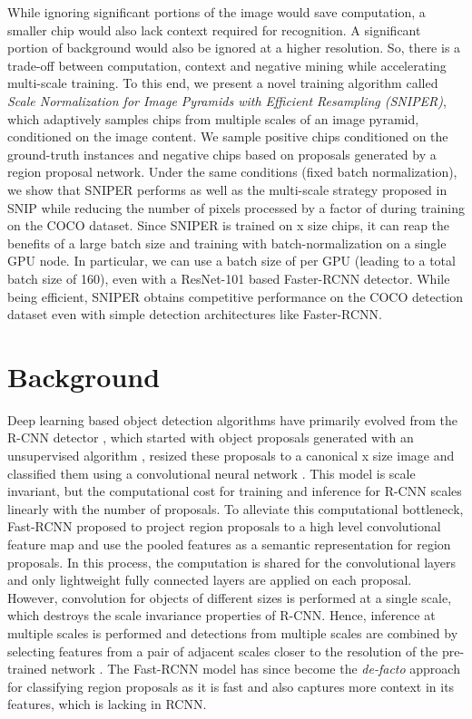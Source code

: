 \documentclass{article}
\begin{document}
While ignoring significant portions of the image would save computation, a smaller chip would also lack context required for recognition. A significant portion of background would also be ignored at a higher resolution. So, there is a trade-off between computation, context and negative mining while accelerating multi-scale training. To this end, we present a novel training algorithm called \textit{Scale Normalization for Image Pyramids with Efficient Resampling (SNIPER)}, which adaptively samples chips from multiple scales of an image pyramid, conditioned on the image content. We sample positive chips conditioned on the ground-truth instances and negative chips based on proposals generated by a region proposal network. Under the same conditions (fixed batch normalization), we show that SNIPER performs as well as the multi-scale strategy proposed in SNIP \cite{singh2017analysis} while reducing the number of pixels processed by a factor of  during training on the COCO dataset. Since SNIPER is trained on x size chips, it can reap the benefits of a large batch size and training with batch-normalization on a single GPU node. In particular, we can use a batch size of  per GPU (leading to a total batch size of 160), even with a ResNet-101 based Faster-RCNN detector. While being efficient, SNIPER obtains competitive performance on the COCO detection dataset even with simple detection architectures like Faster-RCNN. 

\section{Background}
Deep learning based object detection algorithms have primarily evolved from the R-CNN detector \cite{girshick2014rich}, which started with object proposals generated with an unsupervised algorithm \cite{uijlings2013selective}, resized these proposals to a canonical x size image and classified them using a convolutional neural network \cite{lecun1998gradient}. This model is scale invariant, but the computational cost for training and inference for R-CNN scales linearly with the number of proposals. To alleviate this computational bottleneck, Fast-RCNN \cite{girshick2015fast} proposed to project region proposals to a high level convolutional feature map and use the pooled features as a semantic representation for region proposals. In this process, the computation is shared for the convolutional layers and only lightweight fully connected layers are applied on each proposal. However, convolution for objects of different sizes is performed at a single scale, which destroys the scale invariance properties of R-CNN. Hence, inference at multiple scales is performed and detections from multiple scales are combined by selecting features from a pair of adjacent scales closer to the resolution of the pre-trained network \cite{he2014spatial,girshick2015fast}. The Fast-RCNN model has since become the {\em de-facto} approach for classifying region proposals as it is fast and also captures more context in its features, which is lacking in RCNN. 
\end{document}
